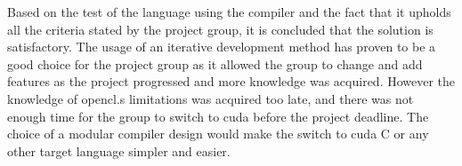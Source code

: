 Based on the test of the language using the compiler and the fact that it upholds all the criteria stated by the project group, it is concluded that the solution is satisfactory.
The usage of an iterative development method has proven to be a good choice for the project group as it allowed the group to change and add features as the project progressed and more knowledge was acquired.
However the knowledge of \gls{opencl}.s limitations was acquired too late, and there was not enough time for the group to switch to \gls{cuda} before the project deadline.
The choice of a modular compiler design would make the switch to \gls{cuda} C or any other target language simpler and easier.